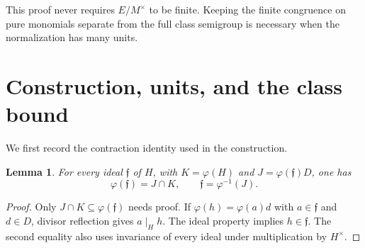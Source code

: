 \documentclass[11pt]{article}
\newtheorem{lemma}[theorem]{Lemma}
\theoremstyle{definition}
\newcommand{\ff}{\mathfrak f}
\begin{document}
This proof never requires $E/M^\times$ to be finite. Keeping the finite congruence on pure monomials separate from the full class semigroup is necessary when the normalization has many units.

\section{Construction, units, and the class bound}

We first record the contraction identity used in the construction.

\begin{lemma}\label{lem:contraction}
For every ideal $\ff$ of $H$, with $K=\varphi(H)$ and $J=\varphi(\ff)D$, one has
\[
 \varphi(\ff)=J\cap K,\qquad \ff=\varphi^{-1}(J).
\]
\end{lemma}
\begin{proof}
Only $J\cap K\subseteq\varphi(\ff)$ needs proof. If $\varphi(h)=\varphi(a)d$ with $a\in\ff$ and $d\in D$, divisor reflection gives $a\mid_H h$. The ideal property implies $h\in\ff$. The second equality also uses invariance of every ideal under multiplication by $H^\times$.
\end{proof}
\end{document}
